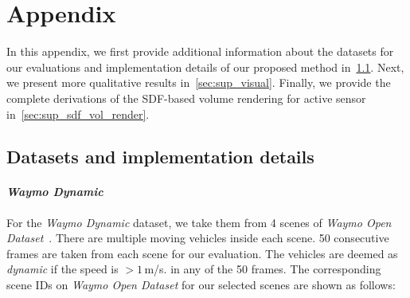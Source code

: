 \section{Appendix}
In this appendix, we first provide additional information about the datasets for our evaluations and implementation details of our proposed method in~\cref{sec:sup_dataset}. Next, we present more qualitative results in~\cref{sec:sup_visual}. Finally, we provide the complete derivations of the SDF-based volume rendering for active sensor in~\cref{sec:sup_sdf_vol_render}. 

\subsection{Datasets and implementation details}\label{sec:sup_dataset}
\paragraph{\textit{Waymo Dynamic}} For the \textit{Waymo Dynamic} dataset, we take them from 4 scenes of \textit{Waymo Open Dataset}~\cite{sun2020scalability}. There are multiple moving vehicles inside each scene. 50 consecutive frames are taken from each scene for our evaluation. The vehicles are deemed as \textit{dynamic} if the speed is $>1\,$m/s. in any of the 50 frames. The corresponding scene IDs on \textit{Waymo Open Dataset} for our selected scenes are shown as follows:

\begin{table}[!h]
    \setlength{\tabcolsep}{4pt}
    \renewcommand{\arraystretch}{1.2}
	\centering
\end{table}

